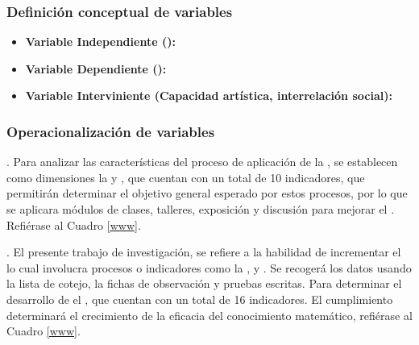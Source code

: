 \documentclass[12pt,a4paper]{article}
\begin{document}
\subsubsection{Definición conceptual de variables}


\begin{itemize}
	\item \textbf{Variable Independiente (\variablei):}

	\item \textbf{Variable Dependiente (\variabled):}

	\item  \textbf{Variable Interviniente (Capacidad artística, interrelación social):}


\end{itemize}

\subsubsection{Operacionalización de variables}
\textbf{\variablei}. Para analizar las características del proceso de aplicación de la \MakeTextLowercase{\variablei}, se establecen como dimensiones la \emph{\MakeTextLowercase{\dimi}} y \emph{\MakeTextLowercase{\dimii}}, que cuentan con un total de 10 indicadores, que permitirán determinar el objetivo general esperado por estos procesos, por lo que se aplicara módulos de clases, talleres, exposición y discusión para mejorar el \MakeTextLowercase{\variabled}. Refiérase al Cuadro \ref{www}.

\textbf{\variabled}. El presente trabajo de investigación, se refiere a la habilidad
de incrementar el \MakeTextLowercase{\variabled} lo cual involucra procesos o indicadores como la \MakeTextLowercase{\dimd}, \MakeTextLowercase{\dimdd} y  \MakeTextLowercase{\dimddd}. Se recogerá los datos usando la lista de cotejo, la fichas de observación y pruebas escritas. Para determinar el desarrollo de el \MakeTextLowercase{\variabled}, que cuentan con un total de 16 indicadores.
El cumplimiento determinará el crecimiento de la  eficacia del conocimiento matemático, refiérase al Cuadro \ref{www}.
\end{document}
